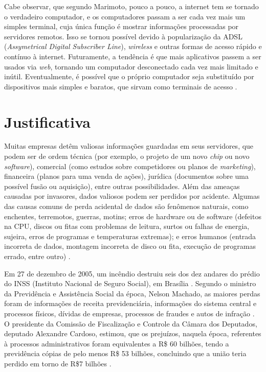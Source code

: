 Cabe observar, que segundo Marimoto, pouco a pouco, a internet tem se tornado o verdadeiro computador, e os computadores passam a ser cada vez mais um simples terminal, cuja única função é mostrar informações processadas por servidores remotos. Isso se tornou possível devido à popularização da ADSL (\textit{Assymetrical Digital Subscriber Line}), \textit{wireless} e outras formas de acesso rápido e contínuo à internet. Futuramente, a tendência é que mais aplicativos passem a ser usados via \textit{web}, tornando um computador desconectado cada vez mais limitado e inútil. Eventualmente, é possível que o próprio computador seja substituído por dispositivos mais simples e baratos, que sirvam como terminais de acesso \cite{Marimoto:2011}.


\section{Justificativa}

Muitas empresas detêm valiosas informações guardadas em seus servidores, que podem ser de ordem técnica (por exemplo, o projeto de um novo \textit{chip} ou novo \textit{software}), comercial (como estudos sobre competidores ou planos de \textit{marketing}), financeira (planos para uma venda de ações), jurídica (documentos sobre uma possível fusão ou aquisição), entre outras possibilidades. Além das ameaças causadas por invasores, dados valiosos podem ser perdidos por acidente. Algumas das causas comuns de perda acidental de dados são fenômenos naturais, como enchentes, terremotos, guerras, motins; erros de hardware ou de software (defeitos na CPU, discos ou fitas com problemas de leitura, surtos ou falhas de energia, sujeira,  erros de programas e temperaturas extremas); e erros humanos (entrada incorreta de dados, montagem incorreta de disco ou fita, execução de programas errado, entre outro) \cite{Tanenbaum:2010,Silberschatz:2000}.

Em 27 de dezembro de 2005, um incêndio destruiu seis dos dez andares do  prédio do INSS (Instituto Nacional de Seguro Social), em  Brasília \cite{Laudo:2006}. Segundo o ministro da Previdência e Assistência Social da época, Nelson Machado, as maiores perdas foram de informações de receita previdenciária, informações do sistema central e processos físicos, dívidas de empresas, processos de fraudes e autos de infração \cite{Machado:2005}. O presidente da Comissão de Fiscalização e Controle da Câmara dos Deputados, deputado Alexandre Cardoso, estimou, que os prejuízos, naquela época, referentes à processos administrativos foram equivalentes a R\$ 60 bilhões, tendo a previdência cópias de pelo menos R\$ 53 bilhões, concluindo que a união teria perdido em torno de R\$7 bilhões \cite{Futema:2005}.

